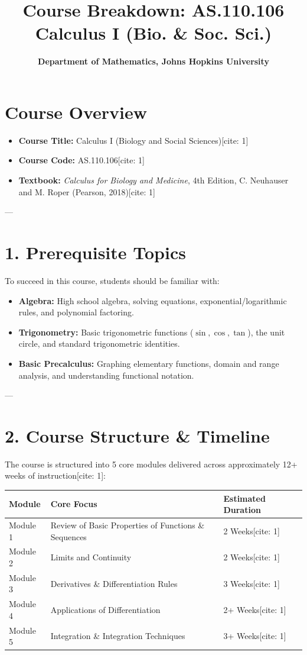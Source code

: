 \documentclass[11pt,a4paper]{article}
\title{\textbf{Course Breakdown: AS.110.106 Calculus I (Bio. \& Soc. Sci.)}}
\author{\textbf{Department of Mathematics, Johns Hopkins University}}
\date{}
\begin{document}
\maketitle

\section*{Course Overview}
\begin{itemize}
    \item \textbf{Course Title:} Calculus I (Biology and Social Sciences)[cite: 1]
    \item \textbf{Course Code:} AS.110.106[cite: 1]
    \item \textbf{Textbook:} \textit{Calculus for Biology and Medicine}, 4th Edition, C. Neuhauser and M. Roper (Pearson, 2018)[cite: 1]
\end{itemize}

---

\section*{1. Prerequisite Topics}
To succeed in this course, students should be familiar with:
\begin{itemize}
    \item \textbf{Algebra:} High school algebra, solving equations, exponential/logarithmic rules, and polynomial factoring.
    \item \textbf{Trigonometry:} Basic trigonometric functions ($\sin, \cos, \tan$), the unit circle, and standard trigonometric identities.
    \item \textbf{Basic Precalculus:} Graphing elementary functions, domain and range analysis, and understanding functional notation.
\end{itemize}

---

\section*{2. Course Structure \& Timeline}
The course is structured into 5 core modules delivered across approximately 12+ weeks of instruction[cite: 1]:

\begin{center}
\begin{tabular}{@{}lll@{}}
\toprule
\textbf{Module} & \textbf{Core Focus} & \textbf{Estimated Duration} \\ \midrule
Module 1 & Review of Basic Properties of Functions \& Sequences & 2 Weeks[cite: 1] \\
Module 2 & Limits and Continuity & 2 Weeks[cite: 1] \\
Module 3 & Derivatives \& Differentiation Rules & 3 Weeks[cite: 1] \\
Module 4 & Applications of Differentiation & 2+ Weeks[cite: 1] \\
Module 5 & Integration \& Integration Techniques & 3+ Weeks[cite: 1] \\ \bottomrule
\end{tabular}
\end{center}
\end{document}
